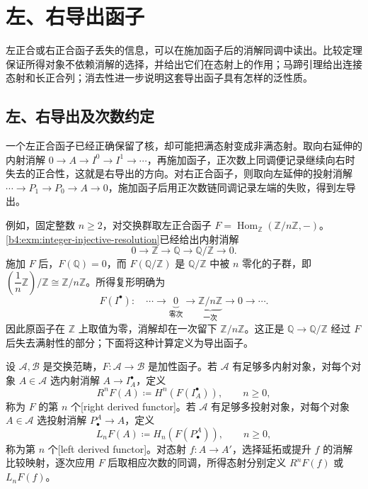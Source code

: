 
\section{左、右导出函子}
\label{b4:sec:0801}

左正合或右正合函子丢失的信息，可以在施加函子后的消解同调中读出。比较定理保证所得对象不依赖消解的选择，并给出它们在态射上的作用；马蹄引理给出连接态射和长正合列；消去性进一步说明这套导出函子具有怎样的泛性质。


%
%

\subsection{左、右导出及次数约定}
\label{b4:subsec:0801:01}

一个左正合函子已经正确保留了核，却可能把满态射变成非满态射。取向右延伸的内射消解 \(0\to A\to I^0\to I^1\to\cdots\)，再施加函子，正次数上同调便记录继续向右时失去的正合性，这就是右导出的方向。对右正合函子，则取向左延伸的投射消解 \(\cdots\to P_1\to P_0\to A\to0\)，施加函子后用正次数链同调记录左端的失败，得到左导出。

\ProseParagraphBreak
例如，固定整数 \(n\ge2\)，对交换群取左正合函子 \(F=\operatorname{Hom}_{\mathbb Z}(\mathbb Z/n\mathbb Z,-)\)。\cref{b4:exm:integer-injective-resolution}已经给出内射消解
\[
	0\longrightarrow\mathbb Z\longrightarrow\mathbb Q \longrightarrow\mathbb Q/\mathbb Z\longrightarrow0.
\]
施加 \(F\) 后，\(F(\mathbb Q)=0\)，而 \(F(\mathbb Q/\mathbb Z)\) 是 \(\mathbb Q/\mathbb Z\) 中被 \(n\) 零化的子群，即 \((\dfrac1n\mathbb Z)/\mathbb Z\cong\mathbb Z/n\mathbb Z\)。所得复形明确为
\[
	F(I^\bullet):\quad\cdots\longrightarrow \underbrace{0}_{\text{零次}}\longrightarrow \underbrace{\mathbb Z/n\mathbb Z}_{\text{一次}}\longrightarrow0\longrightarrow\cdots.
\]
因此原函子在 \(\mathbb Z\) 上取值为零，消解却在一次留下 \(\mathbb Z/n\mathbb Z\)。这正是 \(\mathbb Q\to\mathbb Q/\mathbb Z\) 经过 \(F\) 后失去满射性的部分；下面将这种计算定义为导出函子。

\begin{definition}\label{b4:def:derived-functors}
	设 \(\mathcal A,\mathcal B\) 是交换范畴，\(F:\mathcal A\to\mathcal B\) 是加性函子。若 \(\mathcal A\) 有足够多内射对象，对每个对象 \(A\in\mathcal A\) 选内射消解 \(A\to I_A^\bullet\)，定义
	\[
		R^nF(A)\coloneqq H^n(F(I_A^\bullet)),\qquad n\ge0,
	\]
	称为 \(F\) 的第 \(n\) 个[right derived functor]。若 \(\mathcal A\) 有足够多投射对象，对每个对象 \(A\in\mathcal A\) 选投射消解 \(P^A_\bullet\to A\)，定义
	\[
		L_nF(A)\coloneqq H_n(F(P^A_\bullet)),\qquad n\ge0,
	\]
	称为第 \(n\) 个[left derived functor]。对态射 \(f:A\to A'\)，选择延拓或提升 \(f\) 的消解比较映射，逐次应用 \(F\) 后取相应次数的同调，所得态射分别定义 \(R^nF(f)\) 或 \(L_nF(f)\)。
\end{definition}

